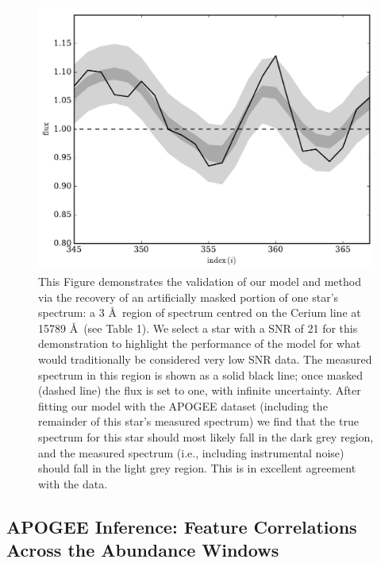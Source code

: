 \documentclass[a4paper,fleqn,usenatbib]{mnras}
\begin{document}
\begin{figure}
	\includegraphics[width=\columnwidth]{apogee_centers_final_29502_spc_rec_test_recovery_zoom.pdf}
    \caption{This Figure demonstrates the validation of our model and method via the recovery of an artificially masked portion of one star's spectrum: a 3 \AA\ region of spectrum centred on the Cerium line at 15789 \AA\ (see Table 1). We select a star with a SNR of 21 for this demonstration to highlight the performance of the model for what would traditionally be considered very low SNR data. The measured spectrum in this region is shown as a solid black line; once masked (dashed line) the flux is set to one, with infinite uncertainty. After fitting our model with the APOGEE dataset (including the remainder of this star's measured spectrum) we find that the true spectrum for this star should most likely fall in the dark grey region, and the measured spectrum (i.e., including instrumental noise) should fall in the light grey region. This is in excellent agreement with the data.}
    \label{fig:recovery_test}
\end{figure}

\subsection{APOGEE Inference: Feature Correlations Across the Abundance Windows}
\end{document}
